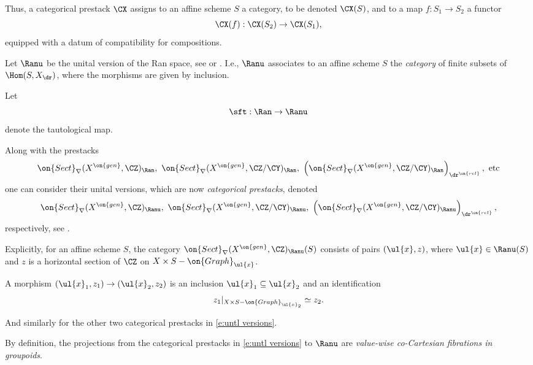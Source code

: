 \documentclass[9pt]{amsart}
\theoremstyle{remark}
\theoremstyle{definition}
\theoremstyle{remark}
\numberwithin{equation}{section}
\begin{document}
\medskip

Thus, a categorical prestack $\CX$ assigns to an affine scheme $S$ a category, to be denoted $\CX(S)$,
and to a map $f:S_1\to S_2$ a functor 
$$\CX(f):\CX(S_2)\to \CX(S_1),$$
equipped with a datum of compatibility for compositions. 

\sssec{} \label{sss:untl Sect}

Let $\Ranu$ be the unital version of the Ran space, see \cite[Sect. 4.2]{Ga4} or \cite[Sect. 2.1]{Ro}. I.e.,
$\Ranu$ associates to an affine scheme $S$ the \emph{category} of finite subsets of $\Hom(S,X_\dr)$,
where the morphisms are given by inclusion.

\medskip

Let
$$\sft:\Ran\to \Ranu$$
denote the tautological map.

\sssec{} \label{sss:sects unital}

Along with the prestacks 
$$\on{Sect}_\nabla(X^{\on{gen}},\CZ)_\Ran,\,\, \on{Sect}_\nabla(X^{\on{gen}},\CZ/\CY)_\Ran,\,\, 
\left(\on{Sect}_\nabla(X^{\on{gen}},\CZ/\CY)_\Ran\right)_{\dr^{\on{rel}}},\,\, \text{etc}$$
one can consider their unital versions, which are now \emph{categorical prestacks}, denoted 
\begin{equation} \label{e:untl versions}
\on{Sect}_\nabla(X^{\on{gen}},\CZ)_\Ranu,\,\, \on{Sect}_\nabla(X^{\on{gen}},\CZ/\CY)_\Ranu,\,\, 
\left(\on{Sect}_\nabla(X^{\on{gen}},\CZ/\CY)_\Ranu\right)_{\dr^{\on{rel}}},
\end{equation}
respectively, see \cite[Sect. 3.3.1]{Ro}. 

\medskip

Explicitly, for an affine scheme $S$, the category $\on{Sect}_\nabla(X^{\on{gen}},\CZ)_\Ranu(S)$ consists 
of pairs $(\ul{x},z)$, where $\ul{x}\in \Ranu(S)$ and $z$ is a horizontal section of $\CZ$ on
$X\times S-\on{Graph}_{\ul{x}}$. 

\medskip

A morphism $(\ul{x}_1,z_1)\to (\ul{x}_2,z_2)$ is an inclusion $\ul{x}_1\subseteq \ul{x}_2$ and an identification
$$z_1|_{X\times S-\on{Graph}_{\ul{x}_2}}\simeq z_2.$$

\medskip

And similarly for the other two categorical prestacks in \eqref{e:untl versions}. 

\sssec{}

By definition, the projections from the categorical prestacks in \eqref{e:untl versions} to 
$\Ranu$ are \emph{value-wise co-Cartesian fibrations in groupoids}. 
\end{document}
